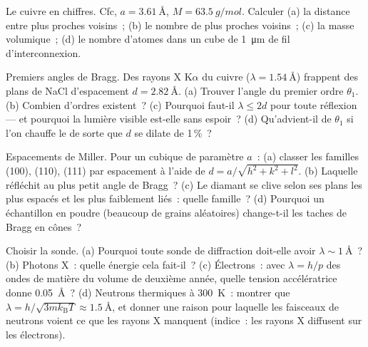 \begin{exercise}[$\star$]\label{exo:b3:crystalline-solids:2}
Le cuivre en chiffres. Cfc, $a = \qty{3.61}{\angstrom}$, $M =
\qty{63.5}{g/mol}$. Calculer (a) la distance entre plus proches
voisins~; (b) le nombre de plus proches voisins~; (c) la masse
volumique~; (d) le nombre d'atomes dans un cube de \qty{1}{\micro m}
de fil d'interconnexion.
\end{exercise}

\begin{exercise}[$\star$]\label{exo:b3:crystalline-solids:3}
Premiers angles de Bragg. Des rayons X K$\alpha$ du cuivre
($\lambda = \qty{1.54}{\angstrom}$) frappent des plans de NaCl
d'espacement $d = \qty{2.82}{\angstrom}$. (a) Trouver l'angle du
premier ordre $\theta_1$. (b) Combien d'ordres existent~? (c)
Pourquoi faut-il $\lambda \le 2d$ pour toute réflexion --- et
pourquoi la lumière visible est-elle sans espoir~? (d) Qu'advient-il
de $\theta_1$ si l'on chauffe le  de sorte que $d$ se dilate
de 1\,\%~?
\end{exercise}

\begin{exercise}[$\star$]\label{exo:b3:crystalline-solids:4}
Espacements de Miller. Pour un  cubique de paramètre $a$~: (a)
classer les familles (100), (110), (111) par espacement à l'aide de
$d = a/\sqrt{h^2+k^2+l^2}$. (b) Laquelle réfléchit au plus petit
angle de Bragg~? (c) Le diamant se clive selon ses plans les plus
espacés et les plus faiblement liés~: quelle famille~? (d) Pourquoi un
échantillon en poudre (beaucoup de grains aléatoires) change-t-il les
taches de Bragg en cônes~?
\end{exercise}

\begin{exercise}[$\star\star$]\label{exo:b3:crystalline-solids:5}
Choisir la sonde. (a) Pourquoi toute sonde de diffraction doit-elle
avoir $\lambda \sim \qty{1}{\angstrom}$~? (b) Photons X~: quelle
énergie cela fait-il~? (c) Électrons~: avec $\lambda = h/p$ des ondes
de matière du volume de deuxième année, quelle tension accélératrice
donne \qty{0.05}{\angstrom}~? (d) Neutrons thermiques à \qty{300}{K}~:
montrer que
$\lambda = h/\sqrt{3mk_{\text{B}}T} \approx \qty{1.5}{\angstrom}$,
et donner une raison pour laquelle les faisceaux de neutrons voient ce
que les rayons X manquent (indice~: les rayons X diffusent sur les
électrons).
\end{exercise}

